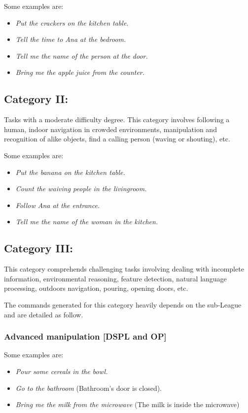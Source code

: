 Some examples are:
\begin{itemize}
	\item \textit{Put the crackers on the kitchen table.}
	\item \textit{Tell the time to Ana at the bedroom.}
	\item \textit{Tell me the name of the person at the door.}
	\item \textit{Bring me the apple juice from the counter.}
\end{itemize}

\subsection{Category II:}
Tasks with a moderate difficulty degree. This category involves following a human, indoor navigation in crowded environments, manipulation and recognition of alike objects, find a calling person (waving or shouting), etc. 

Some examples are:
\begin{itemize}
	\item \textit{Put the banana on the kitchen table.}
	\item \textit{Count the waiving people in the livingroom.}
	\item \textit{Follow Ana at the entrance.}
	\item \textit{Tell me the name of the woman in the kitchen.}
\end{itemize}


\subsection{Category III:}
This category comprehends challenging tasks involving dealing with incomplete information, environmental reasoning, feature detection, natural language processing, outdoors navigation, pouring, opening doors, etc.

The commands generated for this category heavily depends on the sub-League and are detailed as follow.

\subsubsection{Advanced manipulation [DSPL and OP]}
Some examples are:
\begin{itemize}
	\item \textit{Pour some cereals in the bowl.}
	\item \textit{Go to the bathroom} (Bathroom's door is closed).
	\item \textit{Bring me the milk from the microwave} (The milk is inside the microwave)
\end{itemize}

